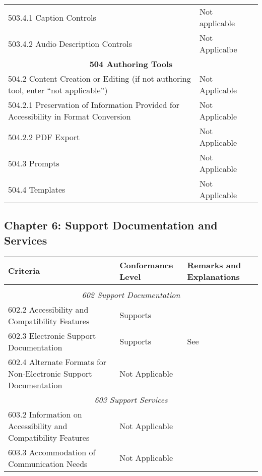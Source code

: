 \documentclass{report}
\begin{document}
\begin{longtable}{p{}<{\RaggedRight}p{}<{\RaggedRight}p{}<{\RaggedRight}}
  503.4.1 Caption Controls & Not applicable\\
  503.4.2 Audio Description Controls & Not Applicalbe\\
  \multicolumn{3}{c}{\bfseries 504 Authoring Tools}\\*
  504.2 Content Creation or Editing (if not authoring tool, enter
  ``not applicable'') & Not Applicable\\
  504.2.1 Preservation of Information Provided for Accessibility in
  Format Conversion & Not Applicable\\
  504.2.2 PDF Export & Not Applicable\\
  504.3 Prompts & Not Applicable\\
  504.4 Templates & Not Applicable\\
\end{longtable}

\subsection{Chapter 6: Support Documentation and Services}
\label{sec:508-6}

\begin{longtable}{p{}<{\RaggedRight}p{}<{\RaggedRight}p{}<{\RaggedRight}}
  \toprule
  Criteria & Conformance Level & Remarks and Explanations \\
  \midrule
  \endhead
  \bottomrule
  \endfoot
\multicolumn{3}{c}{\bfseries 601.1 Scope}\\*
  \multicolumn{3}{c}{\itshape 602 Support Documentation}\\*
  602.2 Accessibility and Compatibility Features & Supports\\
  602.3 Electronic Support Documentation & Supports & See
                                                      \nameref{sec:wcag} \\
  602.4 Alternate Formats for Non-Electronic Support Documentation &
                                                                     Not
                                                                     Applicable
  \\ 
  \multicolumn{3}{c}{\itshape 603 Support Services}\\*
  603.2 Information on Accessibility and Compatibility Features & Not
                                                                  Applicable\\ 
  603.3 Accommodation of Communication Needs & Not Applicable\\
\end{longtable}
\end{document}
